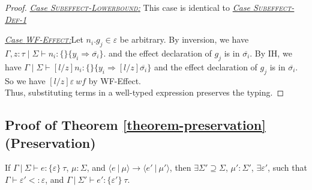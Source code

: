 \begin{proof}
\noindent\underline{\textit{Case \textsc{Subeffect-Lowerbound}:}}
This case is identical to \underline{\textit{Case \textsc{Subeffect-Def-1}}}


\noindent\underline{\textit{Case \textsc{WF-Effect}:}}Let $n_i.g_j \in \varepsilon$ be arbitrary. By inversion, we have
$\Gamma, z : \tau \mid \Sigma \vdash n_i : \{\} \{y_i \Rightarrow \overline{\sigma_i}\}$.
and the effect declaration of $g_j$ is in $\overline{\sigma_i}$. 
By IH, we have 
$\Gamma \mid \Sigma \vdash [l/z]n_i : \{\} \{y_i \Rightarrow [l/z]\overline{\sigma_i}\}$
and the effect declaration of $g_j$ is in $\overline{\sigma_i}$. So we have $[l/z]\varepsilon\ wf$ by WF-Effect. \\[3ex]


\noindent Thus, substituting terms in a well-typed expression preserves the typing.
\end{proof}


\subsection{Proof of Theorem \ref{theorem-preservation} (Preservation)}
\label{app-preservation}


If \mbox{$\Gamma~|~\Sigma \vdash e : \{ \varepsilon \}~\tau$}, \mbox{$\mu : \Sigma$}, and \mbox{$\langle e~|~\mu \rangle \longrightarrow \langle e'~|~\mu' \rangle$}, then \mbox{$\exists \Sigma' \supseteq \Sigma$}, \mbox{$\mu' : \Sigma'$}, $\exists \varepsilon'$, such that $\Gamma \vdash \varepsilon' <: \varepsilon$, and \mbox{$\Gamma~|~\Sigma' \vdash e' : \{ \varepsilon' \}~\tau$}.


